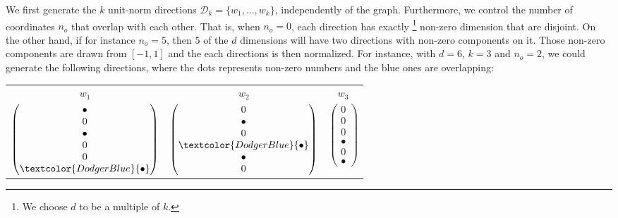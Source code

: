 We first generate the $k$ unit-norm directions $\mathcal{D}_k=\{w_1, \ldots, w_k\}$, independently
of the graph. Furthermore, we control the number of coordinates $n_o$ that overlap with each other.
That is, when $n_o = 0$, each direction has exactly \footnote{We choose $d$ to be a
multiple of $k$.} non-zero dimension that are disjoint. On the other hand, if for instance $n_o=5$,
then $5$ of the $d$ dimensions will have two directions with non-zero components on it. Those
non-zero components are drawn \uar{} from $[-1, 1]$ and the each directions is then normalized. For
instance, with $d=6$, $k=3$ and $n_o=2$, we could generate the following directions, where the dots
represents non-zero numbers and the blue ones are overlapping:
\vspace{-.5\baselineskip}
\begin{center}
  \begin{tabular}{ccc}
    $w_1$ & $w_2$ & $w_3$ \\
    $\begin{pmatrix}
      \bullet \\
      0 \\
      \bullet \\
      0 \\
      0 \\
      \textcolor{DodgerBlue}{\bullet}
    \end{pmatrix}$ &
    $\begin{pmatrix}
      0 \\
      \bullet \\
      0 \\
      \textcolor{DodgerBlue}{\bullet} \\
      \bullet \\
      0
    \end{pmatrix}$ &
    $\begin{pmatrix}
      0 \\
      0 \\
      0 \\
      \bullet \\
      0 \\
      \bullet
    \end{pmatrix}$
  \end{tabular}
\end{center}

